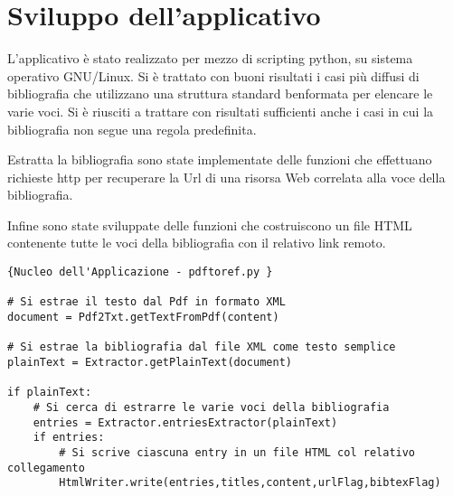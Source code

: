 \section{Sviluppo dell'applicativo}

L'applicativo è stato realizzato per mezzo di scripting python, su sistema operativo GNU/Linux. Si è trattato con buoni risultati i casi più diffusi di bibliografia che utilizzano una struttura standard benformata per elencare le varie voci. Si è riusciti a trattare con risultati sufficienti anche i casi in cui la bibliografia non segue una regola predefinita.

Estratta la bibliografia sono state implementate delle funzioni che effettuano richieste http per recuperare la Url di una risorsa Web correlata alla voce della bibliografia. 

Infine sono state sviluppate delle funzioni che costruiscono un file HTML contenente tutte le voci della bibliografia con il relativo link remoto.

\begin{lstlisting}[frame=r,caption=Nucleo dell'Applicazione - pdftoref.py ,breaklines=true,basicstyle=\small]{Nucleo dell'Applicazione - pdftoref.py }

# Si estrae il testo dal Pdf in formato XML
document = Pdf2Txt.getTextFromPdf(content)

# Si estrae la bibliografia dal file XML come testo semplice
plainText = Extractor.getPlainText(document)

if plainText:
	# Si cerca di estrarre le varie voci della bibliografia 
	entries = Extractor.entriesExtractor(plainText)
	if entries:
		# Si scrive ciascuna entry in un file HTML col relativo collegamento
		HtmlWriter.write(entries,titles,content,urlFlag,bibtexFlag)

\end{lstlisting}

